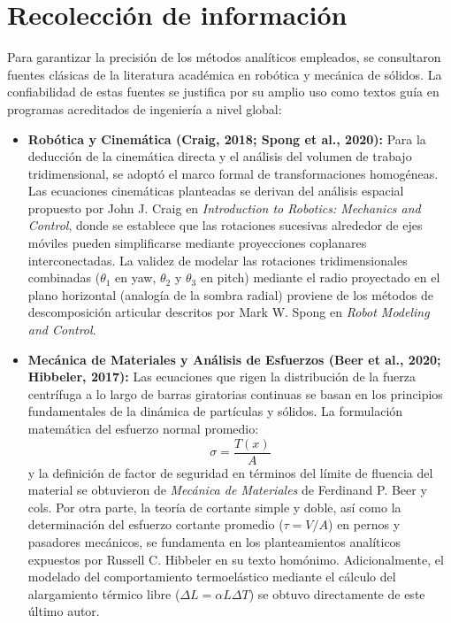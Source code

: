 \documentclass[11pt,a4paper]{article}
\begin{document}
\section{Recolección de información}
Para garantizar la precisión de los métodos analíticos empleados, se consultaron fuentes clásicas de la literatura académica en robótica y mecánica de sólidos. La confiabilidad de estas fuentes se justifica por su amplio uso como textos guía en programas acreditados de ingeniería a nivel global:
\begin{itemize}
    \item \textbf{Robótica y Cinemática (Craig, 2018; Spong et al., 2020):}
    Para la deducción de la cinemática directa y el análisis del volumen de trabajo tridimensional, se adoptó el marco formal de transformaciones homogéneas. Las ecuaciones cinemáticas planteadas se derivan del análisis espacial propuesto por John J. Craig en \textit{Introduction to Robotics: Mechanics and Control}, donde se establece que las rotaciones sucesivas alrededor de ejes móviles pueden simplificarse mediante proyecciones coplanares interconectadas. La validez de modelar las rotaciones tridimensionales combinadas ($\theta_1$ en yaw, $\theta_2$ y $\theta_3$ en pitch) mediante el radio proyectado en el plano horizontal (analogía de la sombra radial) proviene de los métodos de descomposición articular descritos por Mark W. Spong en \textit{Robot Modeling and Control}.
    \item \textbf{Mecánica de Materiales y Análisis de Esfuerzos (Beer et al., 2020; Hibbeler, 2017):}
    Las ecuaciones que rigen la distribución de la fuerza centrífuga a lo largo de barras giratorias continuas se basan en los principios fundamentales de la dinámica de partículas y sólidos. La formulación matemática del esfuerzo normal promedio:
    $$\sigma = \frac{T(x)}{A}$$
    y la definición de factor de seguridad en términos del límite de fluencia del material se obtuvieron de \textit{Mecánica de Materiales} de Ferdinand P. Beer y cols. Por otra parte, la teoría de cortante simple y doble, así como la determinación del esfuerzo cortante promedio ($\tau = V / A$) en pernos y pasadores mecánicos, se fundamenta en los planteamientos analíticos expuestos por Russell C. Hibbeler en su texto homónimo. Adicionalmente, el modelado del comportamiento termoelástico mediante el cálculo del alargamiento térmico libre ($\Delta L = \alpha L \Delta T$) se obtuvo directamente de este último autor.
\end{itemize}

\end{document}

